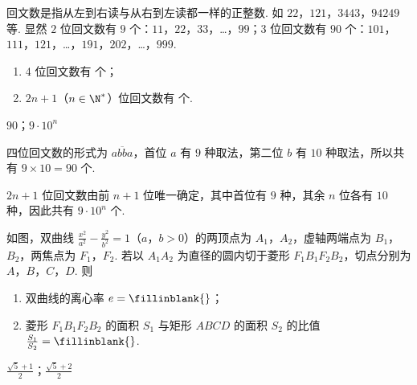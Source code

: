 \begin{problem}
回文数是指从左到右读与从右到左读都一样的正整数. 如 \(22\)，\(121\)，\(3443\)，\(94249\) 等. 显然 \(2\) 位回文数有 \(9\) 个：\(11\)，\(22\)，\(33\)，…，\(99\)；\(3\) 位回文数有 \(90\) 个：\(101\)，\(111\)，\(121\)，…，\(191\)，\(202\)，…，\(999\).
\begin{enumerate}

\item 4 位回文数有\fillinblank{} 个；
\item \( 2n+1 \)（\( n \in \N^{*} \)）位回文数有\fillinblank{} 个.
\end{enumerate}
\end{problem}

\begin{answer}
\(90\)；\(9\cdot 10^{n}\)
\end{answer}

\begin{solution}
四位回文数的形式为 \(\overline{abba}\)，首位 \(a\) 有 \(9\) 种取法，第二位 \(b\) 有 \(10\) 种取法，所以共有 \(9\times10=90\) 个.

\(2n+1\) 位回文数由前 \(n+1\) 位唯一确定，其中首位有 \(9\) 种，其余 \(n\) 位各有 \(10\) 种，因此共有 \(9\cdot10^n\) 个.
\end{solution}

\begin{problem}
如图，双曲线 \(\frac{x^2}{a^2} - \frac{y^2}{b^2} = 1\)（\(a\)，\(b > 0\)）的两顶点为 \(A_1\)，\(A_2\)，虚轴两端点为 \(B_1\)，\(B_2\)，两焦点为 \(F_1\)，\(F_2\). 若以 \(A_1A_2\) 为直径的圆内切于菱形 \(F_1B_1F_2B_2\)，切点分别为 \(A\)，\(B\)，\(C\)，\(D\). 则

\begin{enumerate}
\item 双曲线的离心率 \(e =\fillinblank{}\)；
\item 菱形 \(F_{1}B_{1}F_{2}B_{2}\) 的面积 \(S_{1}\) 与矩形 \(ABCD\) 的面积 \(S_{2}\) 的比值 \(\frac{S_{1}}{S_{2}} =\fillinblank{}\).
\end{enumerate}

\end{problem}

\begin{answer}
\(\frac{\sqrt{5}+1}{2}\)；\(\frac{\sqrt{5}+2}{2}\)
\end{answer}

